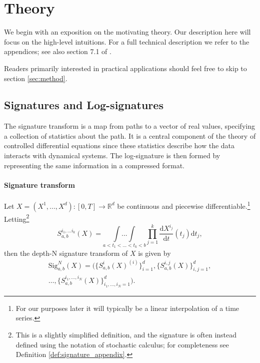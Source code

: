 \documentclass{article}
\newcommand{\dby}{\mathrm{d}}
\begin{document}
%
 


\section{Theory}\label{sec:theory}
We begin with an exposition on the motivating theory. Our description here will focus on the high-level intuitions. For a full technical description we refer to the appendices; see also section 7.1 of \cite{friz2010multidimensional}.

Readers primarily interested in practical applications should feel free to skip to section \ref{sec:method}.

\subsection{Signatures and Log-signatures} \label{subsec:signatures}

The signature transform is a map from paths to a vector of real values, specifying a collection of statistics about the path. It is a central component of the theory of controlled differential equations since these statistics describe how the data interacts with dynamical systems. The log-signature is then formed by representing the same information in a compressed format.










\paragraph{Signature transform} Let $X = (X^1, ..., X^d): [0, T] \rightarrow \mathbb{R}^d$ be continuous and piecewise differentiable.\footnote{For our purposes later it will typically be a linear interpolation of a time series.} Letting\footnote{This is a slightly simplified definition, and the signature is often instead defined using the notation of stochastic calculus; for completeness see Definition \ref{def:signature_appendix}.}
\begin{equation}
    S^{i_1,...i_k}_{a, b}(X) = \underset{\scriptscriptstyle a < t_1 < ... < t_k < b}{\int ... \int} \prod^k_{j=1} \frac{\dby X^{i_j}}{\dby t} (t_j) \dby t_j,
    \label{eq:signature}
\end{equation}
then the depth-N signature transform of $X$ is given by
\begin{multline}
    \mathrm{Sig}^N_{a, b}(X) = \Big(\big\{S^i_{a, b}(X)^{(i)}\big\}_{i = 1}^{d}, \big\{S^{i, j}_{a, b}(X)\big\}_{i, j = 1}^{d}, \\ 
    \ldots, \big\{S^{i_1,\ldots, i_N}_{a,b}(X)\big\}_{i_1, \ldots, i_N = 1}^{d}\Big).
    \label{eq:truncated_path_signature}
\end{multline}
\end{document}
